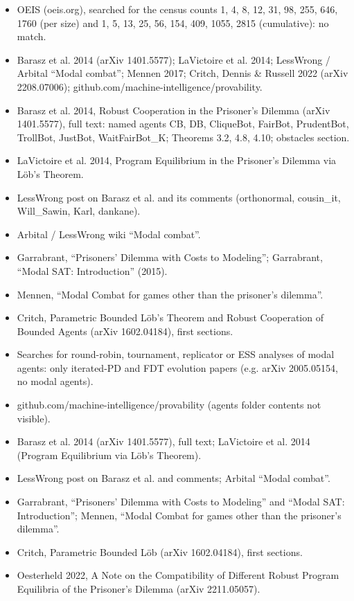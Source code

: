 \documentclass{article}
\begin{document}
\begin{itemize}
\item OEIS (oeis.org), searched for the census counts 1, 4, 8, 12, 31, 98, 255, 646, 1760 (per size) and 1, 5, 13, 25, 56, 154, 409, 1055, 2815 (cumulative): no match.
\item Barasz et al. 2014 (arXiv 1401.5577); LaVictoire et al. 2014; LessWrong / Arbital ``Modal combat''; Mennen 2017; Critch, Dennis \& Russell 2022 (arXiv 2208.07006); github.com/machine-intelligence/provability.
\item Barasz et al. 2014, Robust Cooperation in the Prisoner's Dilemma (arXiv 1401.5577), full text: named agents CB, DB, CliqueBot, FairBot, PrudentBot, TrollBot, JustBot, WaitFairBot\_K; Theorems 3.2, 4.8, 4.10; obstacles section.
\item LaVictoire et al. 2014, Program Equilibrium in the Prisoner's Dilemma via Löb's Theorem.
\item LessWrong post on Barasz et al. and its comments (orthonormal, cousin\_it, Will\_Sawin, Karl, dankane).
\item Arbital / LessWrong wiki ``Modal combat''.
\item Garrabrant, ``Prisoners' Dilemma with Costs to Modeling''; Garrabrant, ``Modal SAT: Introduction'' (2015).
\item Mennen, ``Modal Combat for games other than the prisoner's dilemma''.
\item Critch, Parametric Bounded Löb's Theorem and Robust Cooperation of Bounded Agents (arXiv 1602.04184), first sections.
\item Searches for round-robin, tournament, replicator or ESS analyses of modal agents: only iterated-PD and FDT evolution papers (e.g. arXiv 2005.05154, no modal agents).
\item github.com/machine-intelligence/provability (agents folder contents not visible).
\item Barasz et al. 2014 (arXiv 1401.5577), full text; LaVictoire et al. 2014 (Program Equilibrium via Löb's Theorem).
\item LessWrong post on Barasz et al. and comments; Arbital ``Modal combat''.
\item Garrabrant, ``Prisoners' Dilemma with Costs to Modeling'' and ``Modal SAT: Introduction''; Mennen, ``Modal Combat for games other than the prisoner's dilemma''.
\item Critch, Parametric Bounded Löb (arXiv 1602.04184), first sections.
\item Oesterheld 2022, A Note on the Compatibility of Different Robust Program Equilibria of the Prisoner's Dilemma (arXiv 2211.05057).
\end{itemize}
\end{document}
